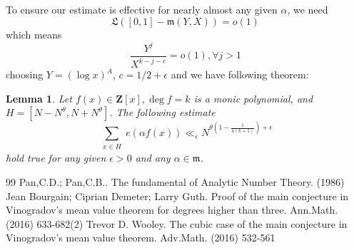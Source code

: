 \documentclass[10pt,a4paper]{amsart}
\newtheorem{lemma}{Lemma}[section]
\begin{document}
To ensure our estimate is effective for nearly almost any given $\alpha$, we need
\[
\mathfrak{L}([0,1]-\mathfrak{m}(Y,X))=o(1)
\]
which means
\[
\frac{Y^j}{X^{k-j-c}}=o(1),\forall j>1
\]
choosing $Y=(\log x)^A$, $c=1/2+\epsilon$ and we have following theorem:
\begin{lemma}
Let $f(x)\in\textbf{Z}[x],\deg f=k$ is a monic polynomial, and $H=[N-N^\theta,N+N^\theta]$. The following estimate
\[
\sum\limits_{\substack{x\in H}}e(\alpha f(x))\ll_\epsilon N^{\theta(1-\frac{1}{4(k+1)})+\epsilon}
\]
hold true for any given $\epsilon>0$ and any $\alpha\in\mathfrak{m}$.
\end{lemma}

\begin{thebibliography}{99}
 Pan,C.D.; Pan,C.B.. The fundamental of Analytic Number Theory. (1986)
 Jean Bourgain; Ciprian Demeter; Larry Guth. Proof of the main conjecture in Vinogradov's mean value theorem for degrees higher than three. Ann.Math. (2016) 633-682(2)
 Trevor D. Wooley. The cubic case of the main conjecture in Vinogradov's mean value theorem. Adv.Math. (2016) 532-561
\end{thebibliography}
\end{document}
